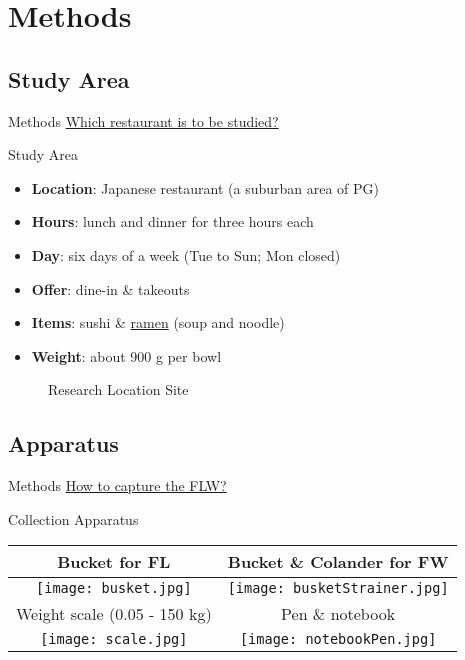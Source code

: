 \documentclass{beamer}\usepackage[]{graphicx}\usepackage[]{xcolor}
\begin{document}
\section{Methods}
\subsection{Study Area}
\begin{frame}{Methods}
    \underline{Which restaurant is to be studied?}
    \begin{block}{Study Area}
        \begin{itemize}
            \item \textbf{Location}: Japanese restaurant (a suburban area of PG)
            \item \textbf{Hours}: lunch and dinner for three hours each
            \item \textbf{Day}: six days of a week (Tue to Sun; Mon closed)
            \item \textbf{Offer}: dine-in \& takeouts
            \item \textbf{Items}: sushi \& \underline{ramen} (soup and noodle)
            \item \textbf{Weight}: about 900 g per bowl
        \end{itemize}
    \end{block}
    
        \begin{figure}
            \centering
            \qquad
            \caption{Research Location Site}
        \end{figure}
\end{frame}

\subsection{Apparatus}
\begin{frame}{Methods}
    \underline{How to capture the FLW?}
    \begin{block}{Collection Apparatus}
            \begin{tabular}{cc}
                    Bucket for FL & Bucket \& Colander for FW \\ \hline
                    \texttt{[image: busket.jpg]}
                    & 
                    \texttt{[image: busketStrainer.jpg]}\\
                    \hline
                    Weight scale (0.05 - 150 kg) & Pen \& notebook\\ %
                    \texttt{[image: scale.jpg]}
                    & 
                    \texttt{[image: notebookPen.jpg]}
            \end{tabular}
    \end{block}
\end{frame}
\end{document}
